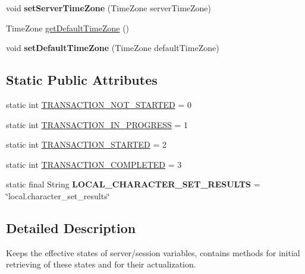 \begin{DoxyCompactItemize}
void {\bfseries set\+Server\+Time\+Zone} (Time\+Zone server\+Time\+Zone)
\item 
Time\+Zone \mbox{\hyperlink{interfacecom_1_1mysql_1_1cj_1_1protocol_1_1_server_session_a080efb1043278f9c6d13f7dc24d18476}{get\+Default\+Time\+Zone}} ()
\item 
\mbox{\label{interfacecom_1_1mysql_1_1cj_1_1protocol_1_1_server_session_ae27787e7922817a157fdf6208e868756}} 
void {\bfseries set\+Default\+Time\+Zone} (Time\+Zone default\+Time\+Zone)
\end{DoxyCompactItemize}
\subsection*{Static Public Attributes}
\begin{DoxyCompactItemize}
\item 
static int \mbox{\hyperlink{interfacecom_1_1mysql_1_1cj_1_1protocol_1_1_server_session_a414b0a86133ab21c136db9193c914171}{T\+R\+A\+N\+S\+A\+C\+T\+I\+O\+N\+\_\+\+N\+O\+T\+\_\+\+S\+T\+A\+R\+T\+ED}} = 0
\item 
static int \mbox{\hyperlink{interfacecom_1_1mysql_1_1cj_1_1protocol_1_1_server_session_a42bea0e6f2940fd0147e510bdaa972f3}{T\+R\+A\+N\+S\+A\+C\+T\+I\+O\+N\+\_\+\+I\+N\+\_\+\+P\+R\+O\+G\+R\+E\+SS}} = 1
\item 
static int \mbox{\hyperlink{interfacecom_1_1mysql_1_1cj_1_1protocol_1_1_server_session_af60b0a2d347c48deeb686f4a47510b5d}{T\+R\+A\+N\+S\+A\+C\+T\+I\+O\+N\+\_\+\+S\+T\+A\+R\+T\+ED}} = 2
\item 
static int \mbox{\hyperlink{interfacecom_1_1mysql_1_1cj_1_1protocol_1_1_server_session_a6dc86c338ef7963bf59af8b1c0675dde}{T\+R\+A\+N\+S\+A\+C\+T\+I\+O\+N\+\_\+\+C\+O\+M\+P\+L\+E\+T\+ED}} = 3
\item 
\mbox{\label{interfacecom_1_1mysql_1_1cj_1_1protocol_1_1_server_session_a577471e7807b77f7b56c27a243e15919}} 
static final String {\bfseries L\+O\+C\+A\+L\+\_\+\+C\+H\+A\+R\+A\+C\+T\+E\+R\+\_\+\+S\+E\+T\+\_\+\+R\+E\+S\+U\+L\+TS} = \char`\"{}local.\+character\+\_\+set\+\_\+results\char`\"{}
\end{DoxyCompactItemize}


\subsection{Detailed Description}
Keeps the effective states of server/session variables, contains methods for initial retrieving of these states and for their actualization. 

